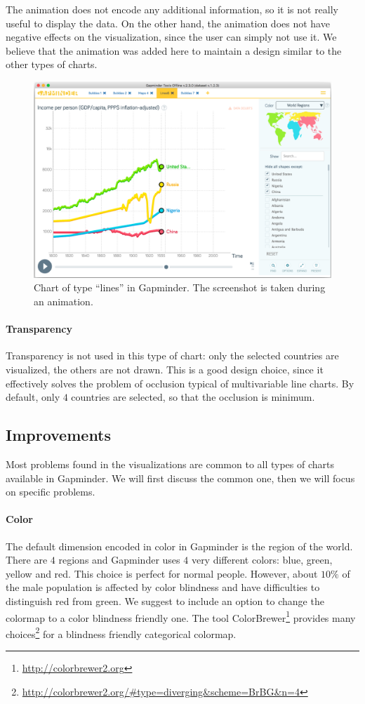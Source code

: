 The animation does not encode any additional information, so it is not really useful to display the data.
On the other hand, the animation does not have negative effects on the visualization, since the user can simply not use it.
We believe that the animation was added here to maintain a design similar to the other types of charts.

\begin{figure}[h]
	\centering
	\includegraphics[width=0.95\columnwidth]{figures/lines-animation}
	\caption{Chart of type ``lines'' in Gapminder. The screenshot is taken during an animation.}
	\label{fig:lines-animation}
\end{figure}

\paragraph{Transparency}
Transparency is not used in this type of chart:
only the selected countries are visualized, the others are not drawn.
This is a good design choice, since it effectively solves the problem of occlusion typical of multivariable line charts.
By default, only $4$ countries are selected, so that the occlusion is minimum.

\subsection{Improvements}
Most problems found in the visualizations are common to all types of charts available in Gapminder.
We will first discuss the common one, then we will focus on specific problems.

\paragraph{Color}
The default dimension encoded in color in Gapminder is the region of the world.
There are $4$ regions and Gapminder uses $4$ very different colors: blue, green, yellow and red.
This choice is perfect for normal people.
However, about $10\%$ of the male population is affected by color blindness \cite{color-maps} and have difficulties to distinguish red from green.
We suggest to include an option to change the colormap to a color blindness friendly one.
The tool ColorBrewer\footnote{\url{http://colorbrewer2.org}} provides many choices\footnote{\url{http://colorbrewer2.org/#type=diverging&scheme=BrBG&n=4}} for a blindness friendly categorical colormap.

